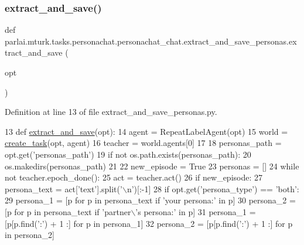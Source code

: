 \subsubsection{\texorpdfstring{extract\+\_\+and\+\_\+save()}{extract\_and\_save()}}
{\footnotesize\ttfamily def parlai.\+mturk.\+tasks.\+personachat.\+personachat\+\_\+chat.\+extract\+\_\+and\+\_\+save\+\_\+personas.\+extract\+\_\+and\+\_\+save (\begin{DoxyParamCaption}\item[{}]{opt }\end{DoxyParamCaption})}



Definition at line 13 of file extract\+\_\+and\+\_\+save\+\_\+personas.\+py.


\begin{DoxyCode}
13 \textcolor{keyword}{def }\hyperlink{namespacepersonachat__eval_1_1extract__and__save__personas_a7bae99c34a0b3f49cbce1328146926fd}{extract\_and\_save}(opt):
14     agent = RepeatLabelAgent(opt)
15     world = \hyperlink{namespaceparlai_1_1core_1_1worlds_a79969c7ba76d4b3c500f5bb776444dc6}{create\_task}(opt, agent)
16     teacher = world.agents[0]
17 
18     personas\_path = opt.get(\textcolor{stringliteral}{'personas\_path'})
19     \textcolor{keywordflow}{if} \textcolor{keywordflow}{not} os.path.exists(personas\_path):
20         os.makedirs(personas\_path)
21 
22     new\_episode = \textcolor{keyword}{True}
23     personas = []
24     \textcolor{keywordflow}{while} \textcolor{keywordflow}{not} teacher.epoch\_done():
25         act = teacher.act()
26         \textcolor{keywordflow}{if} new\_episode:
27             persona\_text = act[\textcolor{stringliteral}{'text'}].split(\textcolor{stringliteral}{'\(\backslash\)n'})[:-1]
28             \textcolor{keywordflow}{if} opt.get(\textcolor{stringliteral}{'persona\_type'}) == \textcolor{stringliteral}{'both'}:
29                 persona\_1 = [p \textcolor{keywordflow}{for} p \textcolor{keywordflow}{in} persona\_text \textcolor{keywordflow}{if} \textcolor{stringliteral}{'your persona:'} \textcolor{keywordflow}{in} p]
30                 persona\_2 = [p \textcolor{keywordflow}{for} p \textcolor{keywordflow}{in} persona\_text \textcolor{keywordflow}{if} \textcolor{stringliteral}{'partner\(\backslash\)'s persona:'} \textcolor{keywordflow}{in} p]
31                 persona\_1 = [p[p.find(\textcolor{stringliteral}{':'}) + 1 :] \textcolor{keywordflow}{for} p \textcolor{keywordflow}{in} persona\_1]
32                 persona\_2 = [p[p.find(\textcolor{stringliteral}{':'}) + 1 :] \textcolor{keywordflow}{for} p \textcolor{keywordflow}{in} persona\_2]

\end{DoxyCode}
